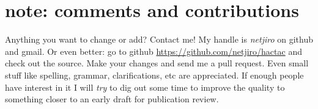 \documentclass[11pt, twoside, titlepage, a4paper]{report}
\begin{document}
\section*{note: comments and contributions}
Anything you want to change or add? Contact me! My handle is \emph{netjiro} on github and gmail. Or even better: go to github \url{https://github.com/netjiro/hactac} and check out the source. Make your changes and send me a pull request. Even small stuff like spelling, grammar, clarifications, etc are appreciated. If enough people have interest in it I will \emph{try} to dig out some time to improve the quality to something closer to an early draft for publication review.


%







\cleardoublepage                %
\thispagestyle{empty}

\tableofcontents                %





\cleardoublepage
\flushbottom









\appendix
\raggedbottom






\end{document}

